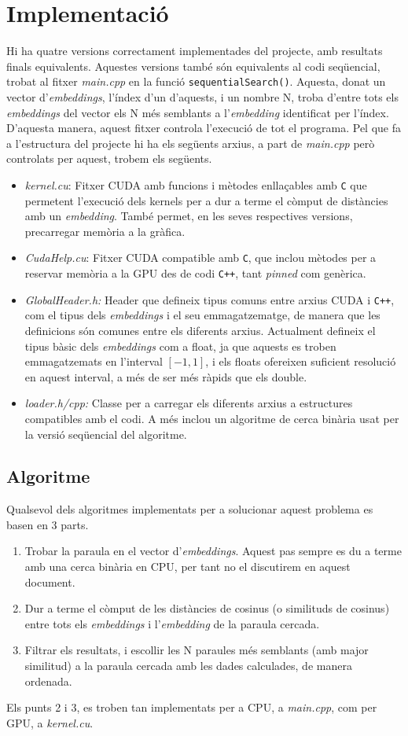\documentclass[catalan,10pt,a4paper]{article}
\begin{document}
\section*{Implementació}
Hi ha quatre versions correctament implementades del projecte, amb resultats finals equivalents.\newline
Aquestes versions també són equivalents al codi seqüencial, trobat al fitxer \textit{main.cpp} en la funció \verb|sequentialSearch()|. Aquesta, donat un vector d'\textit{embeddings}, l'índex d'un d'aquests, i un nombre N, troba d'entre tots els \textit{embeddings} del vector els N més semblants a l'\textit{embedding} identificat per l'índex. D'aquesta manera, aquest fitxer controla l'execució de tot el programa.
Pel que fa a l'estructura del projecte hi ha els següents arxius, a part de \textit{main.cpp} però controlats per aquest, trobem els següents.
\begin{itemize}
	\item \textit{kernel.cu}: Fitxer CUDA amb funcions i mètodes enllaçables amb \verb|C| que permetent l'execució dels kernels per a dur a terme el còmput de distàncies amb un \textit{embedding}. També permet, en les seves respectives versions, precarregar memòria a la gràfica.
	\item \textit{CudaHelp.cu}: Fitxer CUDA compatible amb \verb|C|, que inclou mètodes per a reservar memòria a la GPU des de codi \verb|C++|, tant \textit{pinned} com genèrica.
	\item \textit{GlobalHeader.h:} Header que defineix tipus comuns entre arxius CUDA i \verb|C++|, com el tipus dels \textit{embeddings} i el seu emmagatzematge, de manera que les definicions són comunes entre els diferents arxius. Actualment defineix el tipus bàsic dels \textit{embeddings} com a float, ja que aquests es troben emmagatzemats en l'interval $[-1,1]$, i els floats ofereixen suficient resolució en aquest interval, a més de ser més ràpids que els double.
	\item \textit{loader.h/cpp:} Classe per a carregar els diferents arxius a estructures compatibles amb el codi. A més inclou un algoritme de cerca binària usat per la versió seqüencial del algoritme.
\end{itemize}
\subsection*{Algoritme}
Qualsevol dels algoritmes implementats per a solucionar aquest problema es basen en 3 parts.
\begin{enumerate}
	\item Trobar la paraula en el vector d'\textit{embeddings}. Aquest pas sempre es du a terme amb una cerca binària en CPU, per tant no el discutirem en aquest document.
	\item Dur a terme el còmput de les distàncies de cosinus (o similituds de cosinus) entre tots els \textit{embeddings} i l'\textit{embedding} de la paraula cercada.
	\item Filtrar els resultats, i escollir les N paraules més semblants (amb major similitud) a la paraula cercada amb les dades calculades, de manera ordenada.
\end{enumerate}
Els punts 2 i 3, es troben tan implementats per a CPU, a \textit{main.cpp}, com per GPU, a \textit{kernel.cu}.
\end{document}
